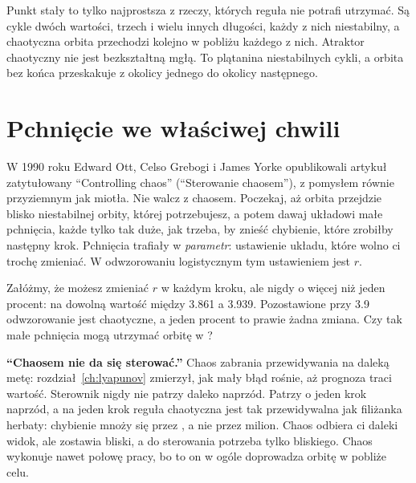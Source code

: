 Punkt stały to tylko najprostsza z rzeczy, których reguła nie potrafi
utrzymać. Są cykle dwóch wartości, trzech i wielu innych długości, każdy z
nich niestabilny, a chaotyczna orbita przechodzi kolejno w pobliżu każdego z
nich. Atraktor chaotyczny nie jest bezkształtną mgłą. To plątanina
niestabilnych cykli, a orbita bez końca przeskakuje z okolicy jednego do
okolicy następnego.

\section{Pchnięcie we właściwej chwili}
\label{sec:ch17-nudge}

\noindent
W 1990 roku Edward Ott, Celso Grebogi i James Yorke opublikowali artykuł
zatytułowany \enquote{Controlling chaos} (\enquote{Sterowanie chaosem}), z
pomysłem równie przyziemnym jak miotła. Nie walcz z chaosem. Poczekaj, aż
orbita przejdzie blisko niestabilnej orbity, której potrzebujesz, a potem dawaj
układowi małe pchnięcia, każde tylko tak duże, jak trzeba, by znieść
chybienie, które zrobiłby następny krok. Pchnięcia trafiały w
\emph{parametr}: ustawienie układu, które wolno ci trochę zmieniać. W odwzorowaniu logistycznym tym
ustawieniem jest $r$.

\begin{think}
Załóżmy, że możesz zmieniać $r$ w każdym kroku, ale nigdy o więcej niż jeden
procent: na dowolną wartość między \num{3.861} a \num{3.939}. Pozostawione
przy \num{3.9} odwzorowanie jest chaotyczne, a jeden procent to prawie żadna
zmiana. Czy tak małe pchnięcia mogą utrzymać orbitę w ?
\end{think}

\begin{trapbox}
\textbf{\enquote{Chaosem nie da się sterować.}} Chaos zabrania przewidywania
na daleką metę: rozdział~\ref{ch:lyapunov} zmierzył, jak mały błąd rośnie,
aż prognoza traci wartość. Sterownik nigdy nie patrzy daleko naprzód. Patrzy
o jeden krok naprzód, a na jeden krok reguła chaotyczna jest tak
przewidywalna jak filiżanka herbaty: chybienie mnoży się przez
, a nie przez milion. Chaos odbiera ci daleki widok, ale
zostawia bliski, a do sterowania potrzeba tylko bliskiego.
Chaos wykonuje nawet połowę pracy, bo to on w ogóle doprowadza orbitę w
pobliże celu.
\end{trapbox}

